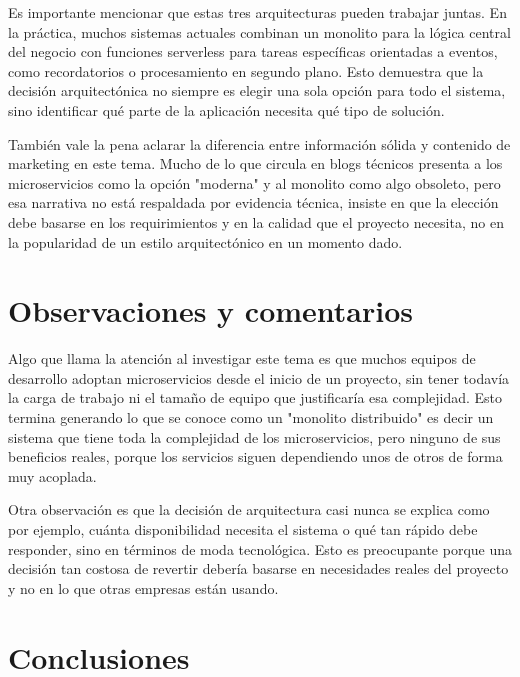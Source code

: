 \documentclass[12pt,letterpaper]{article}
\begin{document}
Es importante mencionar que estas tres arquitecturas pueden trabajar juntas. En la práctica, muchos sistemas actuales combinan un monolito para la lógica central del negocio con funciones serverless para tareas específicas orientadas a eventos, como recordatorios o procesamiento en segundo plano. Esto demuestra que la decisión arquitectónica no siempre es elegir una sola opción para todo el sistema, sino identificar qué parte de la aplicación necesita qué tipo de solución.

También vale la pena aclarar la diferencia entre información sólida y contenido de marketing en este tema. Mucho de lo que circula en blogs técnicos presenta a los microservicios como la opción "moderna" y al monolito como algo obsoleto, pero esa narrativa no está respaldada por evidencia técnica, insiste en que la elección debe basarse en los requirimientos y en la calidad que el proyecto necesita, no en la popularidad de un estilo arquitectónico en un momento dado.

\section*{Observaciones y comentarios}

Algo que llama la atención al investigar este tema es que muchos equipos de desarrollo adoptan microservicios desde el inicio de un proyecto, sin tener todavía la carga de trabajo ni el tamaño de equipo que justificaría esa complejidad. Esto termina generando lo que se conoce como un "monolito distribuido" es decir un sistema que tiene toda la complejidad de los microservicios, pero ninguno de sus beneficios reales, porque los servicios siguen dependiendo unos de otros de forma muy acoplada.

Otra observación es que la decisión de arquitectura casi nunca se explica como por ejemplo, cuánta disponibilidad necesita el sistema o qué tan rápido debe responder, sino en términos de moda tecnológica. Esto es preocupante porque una decisión tan costosa de revertir debería basarse en necesidades reales del proyecto y no en lo que otras empresas están usando.

\section*{Conclusiones}
\end{document}
